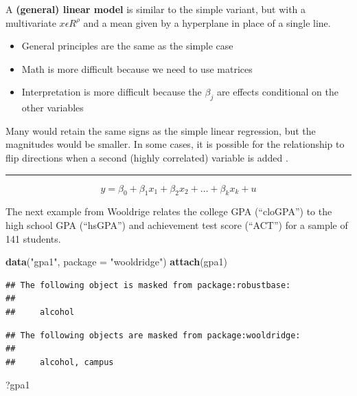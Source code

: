 \documentclass[]{book}
\newenvironment{Shaded}{\begin{snugshade}}{\end{snugshade}}
\newcommand{\DataTypeTok}[1]{\textcolor[rgb]{0.13,0.29,0.53}{#1}}
\newcommand{\KeywordTok}[1]{\textcolor[rgb]{0.13,0.29,0.53}{\textbf{#1}}}
\newcommand{\NormalTok}[1]{#1}
\newcommand{\StringTok}[1]{\textcolor[rgb]{0.31,0.60,0.02}{#1}}
\providecommand{\tightlist}{%
  \setlength{\itemsep}{0pt}\setlength{\parskip}{0pt}}
\begin{document}
A \textbf{(general) linear model} is similar to the simple variant, but with a multivariate \(x \epsilon \!R^{\rho}\) and a mean given by a hyperplane in place of a single line.

\begin{itemize}
\tightlist
\item
  General principles are the same as the simple case
\item
  Math is more difficult because we need to use matrices
\item
  Interpretation is more difficult because the \(\beta_{j}\) are effects conditional on the other variables
\end{itemize}

Many would retain the same signs as the simple linear regression, but the magnitudes would be smaller. In some cases, it is possible for
the relationship to flip directions when a second (highly correlated) variable is added \citet{dalpiaz2016}.

\begin{center}\rule{0.5\linewidth}{\linethickness}\end{center}

\begin{equation}
y = \beta_{0} + \beta_{1}x_{1} +  \beta_{2}x_{2} + \dots + \beta_{k}x_{k} + u   
\label{eq:multipleregression}
\end{equation}

The next example from Wooldrige relates the college GPA (``cloGPA'') to the high school GPA (``hsGPA'') and achievement test score (``ACT'') for a sample of 141 students.

\begin{Shaded}
\begin{Highlighting}[]
\KeywordTok{data}\NormalTok{(}\StringTok{"gpa1"}\NormalTok{, }\DataTypeTok{package =} \StringTok{"wooldridge"}\NormalTok{)}
\KeywordTok{attach}\NormalTok{(gpa1)}
\end{Highlighting}
\end{Shaded}

\begin{verbatim}
## The following object is masked from package:robustbase:
## 
##     alcohol
\end{verbatim}

\begin{verbatim}
## The following objects are masked from package:wooldridge:
## 
##     alcohol, campus
\end{verbatim}

\begin{Shaded}
\begin{Highlighting}[]
\NormalTok{?gpa1}
\end{Highlighting}
\end{Shaded}
\end{document}
